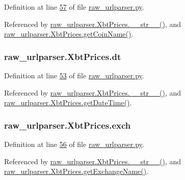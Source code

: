 Definition at line \hyperlink{raw__urlparser_8py_source_l00057}{57} of file \hyperlink{raw__urlparser_8py_source}{raw\+\_\+urlparser.\+py}.



Referenced by \hyperlink{raw__urlparser_8py_source_l00074}{raw\+\_\+urlparser.\+Xbt\+Prices.\+\_\+\+\_\+str\+\_\+\+\_\+()}, and \hyperlink{raw__urlparser_8py_source_l00071}{raw\+\_\+urlparser.\+Xbt\+Prices.\+get\+Coin\+Name()}.

\subsubsection[{\texorpdfstring{dt}{dt}}]{\setlength{\rightskip}{0pt plus 5cm}raw\+\_\+urlparser.\+Xbt\+Prices.\+dt}\hypertarget{classraw__urlparser_1_1_xbt_prices_ae094aa3e73d21d0be219a085f09bcf13}{}\label{classraw__urlparser_1_1_xbt_prices_ae094aa3e73d21d0be219a085f09bcf13}


Definition at line \hyperlink{raw__urlparser_8py_source_l00053}{53} of file \hyperlink{raw__urlparser_8py_source}{raw\+\_\+urlparser.\+py}.



Referenced by \hyperlink{raw__urlparser_8py_source_l00074}{raw\+\_\+urlparser.\+Xbt\+Prices.\+\_\+\+\_\+str\+\_\+\+\_\+()}, and \hyperlink{raw__urlparser_8py_source_l00059}{raw\+\_\+urlparser.\+Xbt\+Prices.\+get\+Date\+Time()}.

\subsubsection[{\texorpdfstring{exch}{exch}}]{\setlength{\rightskip}{0pt plus 5cm}raw\+\_\+urlparser.\+Xbt\+Prices.\+exch}\hypertarget{classraw__urlparser_1_1_xbt_prices_a016bbd95465aaa14b5c434047df7b7fb}{}\label{classraw__urlparser_1_1_xbt_prices_a016bbd95465aaa14b5c434047df7b7fb}


Definition at line \hyperlink{raw__urlparser_8py_source_l00056}{56} of file \hyperlink{raw__urlparser_8py_source}{raw\+\_\+urlparser.\+py}.



Referenced by \hyperlink{raw__urlparser_8py_source_l00074}{raw\+\_\+urlparser.\+Xbt\+Prices.\+\_\+\+\_\+str\+\_\+\+\_\+()}, and \hyperlink{raw__urlparser_8py_source_l00068}{raw\+\_\+urlparser.\+Xbt\+Prices.\+get\+Exchange\+Name()}.

